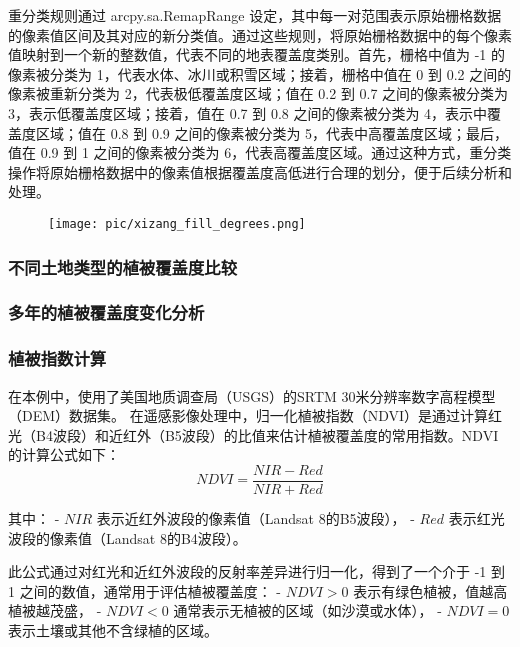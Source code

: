 \documentclass{article}
\begin{document}
				
		\par
		重分类规则通过 arcpy.sa.RemapRange 设定，其中每一对范围表示原始栅格数据的像素值区间及其对应的新分类值。通过这些规则，将原始栅格数据中的每个像素值映射到一个新的整数值，代表不同的地表覆盖度类别。首先，栅格中值为 -1 的像素被分类为 1，代表水体、冰川或积雪区域；接着，栅格中值在 0 到 0.2 之间的像素被重新分类为 2，代表极低覆盖度区域；值在 0.2 到 0.7 之间的像素被分类为 3，表示低覆盖度区域；接着，值在 0.7 到 0.8 之间的像素被分类为 4，表示中覆盖度区域；值在 0.8 到 0.9 之间的像素被分类为 5，代表中高覆盖度区域；最后，值在 0.9 到 1 之间的像素被分类为 6，代表高覆盖度区域。通过这种方式，重分类操作将原始栅格数据中的像素值根据覆盖度高低进行合理的划分，便于后续分析和处理。
		\begin{figure}[H]  %
			\centering
			\texttt{[image: pic/xizang\_fill\_degrees.png]} %
		\end{figure}
		
		
		
		\subsubsection{不同土地类型的植被覆盖度比较}

		
		
		\subsubsection{多年的植被覆盖度变化分析}
		
		
		
		
		
		
		
		\subsubsection{植被指数计算}
		
				
		在本例中，使用了美国地质调查局（USGS）的SRTM 30米分辨率数字高程模型（DEM）数据集。
		在遥感影像处理中，归一化植被指数（NDVI）是通过计算红光（B4波段）和近红外（B5波段）的比值来估计植被覆盖度的常用指数。NDVI的计算公式如下：
		\[
		NDVI = \frac{NIR - Red}{NIR + Red}
		\]
		
		其中：
		- \( NIR \) 表示近红外波段的像素值（Landsat 8的B5波段），
		- \( Red \) 表示红光波段的像素值（Landsat 8的B4波段）。
		
		此公式通过对红光和近红外波段的反射率差异进行归一化，得到了一个介于 -1 到 1 之间的数值，通常用于评估植被覆盖度：
		- \( NDVI > 0 \) 表示有绿色植被，值越高植被越茂盛，
		- \( NDVI < 0 \) 通常表示无植被的区域（如沙漠或水体），
		- \( NDVI = 0 \) 表示土壤或其他不含绿植的区域。
		
\end{document}
